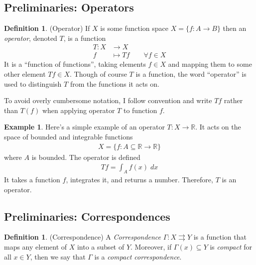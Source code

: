 \documentclass[12pt]{article}
\numberwithin{equation}{section} %
\theoremstyle{plain}
\theoremstyle{definition}
\newtheorem{defn}[thm]{Definition}
\newtheorem{ex}[thm]{Example}
\theoremstyle{remark}
\newcommand{\R}{\mathbb{R}}
\begin{document}
\subsection{Preliminaries: Operators}

\begin{defn}{(Operator)}
If $X$ is some function space
$X = \{f:A\rightarrow B\}$
then an \emph{operator}, denoted $T$, is a function
\begin{align*}
  T:X&\rightarrow X \\
  f&\mapsto Tf
  \qquad \forall f\in X
\end{align*}
It is a ``function of functions'', taking elements $f\in X$ and mapping
them to some other element $Tf\in X$. Though of course $T$ is a
function, the word ``operator'' is used to distinguish $T$ from the
functions it acts on.

To avoid overly cumbersome notation, I follow convention and write $Tf$
rather than $T(f)$ when applying operator $T$ to function $f$.
\end{defn}

\begin{ex}
Here's a simple example of an operator $T:X\rightarrow \R$. It acts on
the space of bounded and integrable functions
\begin{align*}
  X = \{f: A\subseteq \R \rightarrow \R\}
\end{align*}
where $A$ is bounded.
The operator is defined
\begin{align*}
  Tf = \int_A f(x) \; dx
\end{align*}
It takes a function $f$, integrates it, and returns a number.
Therefore, $T$ is an operator.
\end{ex}

\subsection{Preliminaries: Correspondences}

\begin{defn}{(Correspondence)}
A \emph{Correspondence} $\Gamma:X\rightrightarrows Y$ is a function that
maps any element of $X$ into a subset of $Y$. Moreover, if
$\Gamma(x)\subseteq Y$ is \emph{compact} for all $x\in Y$, then we say
that $\Gamma$ is a \emph{compact correspondence}.
\end{defn}
\end{document}

